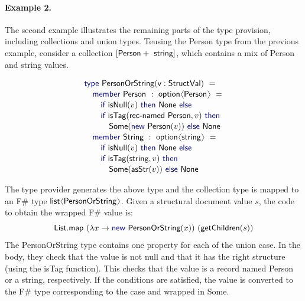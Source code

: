 \documentclass[preprint]{sigplanconf}
\newcommand{\langl}{\begin{picture}(4.5,7)
\put(1.1,2.5){\rotatebox{60}{\line(1,0){5.5}}}
\put(1.1,2.5){\rotatebox{300}{\line(1,0){5.5}}}
\end{picture}}
\newcommand{\rangl}{\begin{picture}(4.5,7)
\put(.9,2.5){\rotatebox{120}{\line(1,0){5.5}}}
\put(.9,2.5){\rotatebox{240}{\line(1,0){5.5}}}
\end{picture}}
\newcommand{\kvd}[1]{\textnormal{\textcolor{kvdclr}{\sffamily #1}}}
\newcommand{\ident}[1]{\textnormal{\sffamily #1}}
\begin{document}
\paragraph{Example 2.} The second example illustrates the remaining parts of the type provision,
including collections and union types. Teusing the \ident{Person} type from the previous example,
consider a collection $[\ident{Person}+\ident{string}]$, which contains a mix of \ident{Person} and string values.

\noindent
\begin{equation*}
\begin{array}{l}
 \kvd{type}~\ident{PersonOrString}(\ident{v}:\ident{StructVal})~= \\[0.1em]
 \quad \kvd{member}~\ident{Person}~:~\ident{option}\langl\ident{Person}\rangl~= \\[0.1em]
 \qquad \kvd{if}~\ident{isNull}(v)~\kvd{then}~\ident{None}~\kvd{else} \\[0.1em]
 \qquad \kvd{if}~\ident{isTag}(\ident{rec-named Person}, v)~\kvd{then}~\\[0.1em]
 \qquad\quad \ident{Some}(\kvd{new}~\ident{Person}(v))~\kvd{else}~\ident{None} \\[0.1em]
 \quad \kvd{member}~\ident{String}~:~\ident{option}\langl\ident{string}\rangl~= \\[0.1em]
 \qquad \kvd{if}~\ident{isNull}(v)~\kvd{then}~\ident{None}~\kvd{else} \\[0.1em]
 \qquad \kvd{if}~\ident{isTag}(\ident{string}, v)~\kvd{then}~\\[0.1em]
 \qquad\quad \ident{Some}(\ident{asStr}(v))~\kvd{else}~\ident{None}
\end{array}
\end{equation*}

\noindent
The type provider generates the above type and the collection type is mapped to an F\# type 
$\ident{list}\langl\ident{PersonOrString}\rangl$. Given a structural document value $s$, the code
to obtain the wrapped F\# value is:
%
\begin{equation*}
\ident{List.map}~(\lambda x\rightarrow\kvd{new}~\ident{PersonOrString}(x))~(\ident{getChildren}(s))
\end{equation*}
%
The \ident{PersonOrString} type contains one property for each of the union case. In the body, they
check that the value is not \kvd{null} and that it has the right structure (using the \ident{isTag}
function). This checks that the value is a record named \ident{Person} or a string, respectively.
If the conditions are satisfied, the value is converted to the F\# type corresponding to the case
and wrapped in \ident{Some}.
\end{document}
